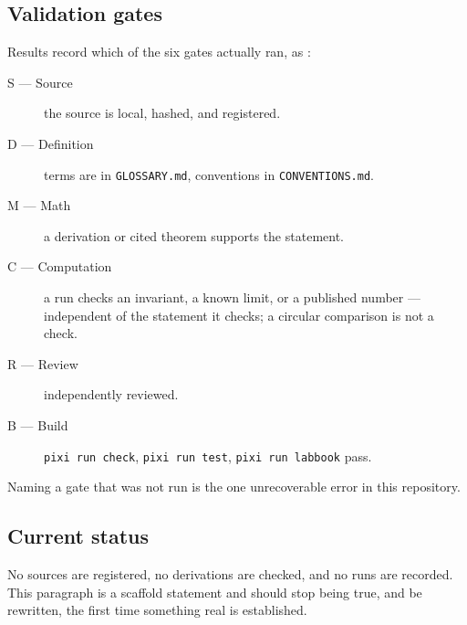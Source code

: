 \subsection*{Validation gates}

Results record which of the six gates actually ran, as :

\begin{description}
  \item[S --- Source] the source is local, hashed, and registered.
  \item[D --- Definition] terms are in \texttt{GLOSSARY.md}, conventions in \texttt{CONVENTIONS.md}.
  \item[M --- Math] a derivation or cited theorem supports the statement.
  \item[C --- Computation] a run checks an invariant, a known limit, or a published number ---
        independent of the statement it checks; a circular comparison is not a check.
  \item[R --- Review] independently reviewed.
  \item[B --- Build] \texttt{pixi run check}, \texttt{pixi run test}, \texttt{pixi run labbook} pass.
\end{description}

Naming a gate that was not run is the one unrecoverable error in this repository.

\subsection*{Current status}

 \evI{} No sources are registered, no derivations are checked, and no runs are
recorded. This paragraph is a scaffold statement and should stop being true, and be rewritten, the
first time something real is established.
